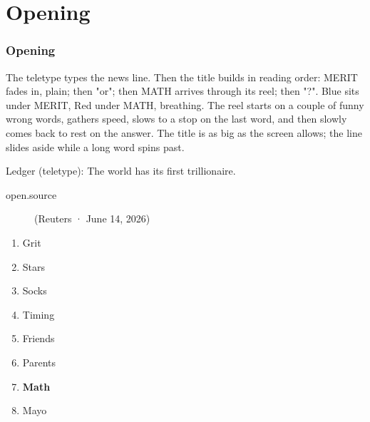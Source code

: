 

\chapter*{Opening}

\subsection*{Opening}

\label{title}

The teletype types the news line. Then the title builds in reading order:
MERIT fades in, plain; then "or"; then MATH arrives through its reel; then
"?". Blue sits under MERIT, Red under MATH, breathing. The reel starts on a
couple of funny wrong words, gathers speed, slows to a stop on the last
word, and then slowly comes back to rest on the answer. The title is as big
as the screen allows; the line slides aside while a long word spins past.


Ledger (teletype): The world has its first trillionaire.

\begin{description}
  \item[open.source] (Reuters · June 14, 2026)
\end{description}




\begin{enumerate}
  \item[hold 3] Grit
  \item Stars
  \item Socks
  \item Timing
  \item Friends
  \item Parents
  \item \textbf{Math}
  \item Mayo
\end{enumerate}

